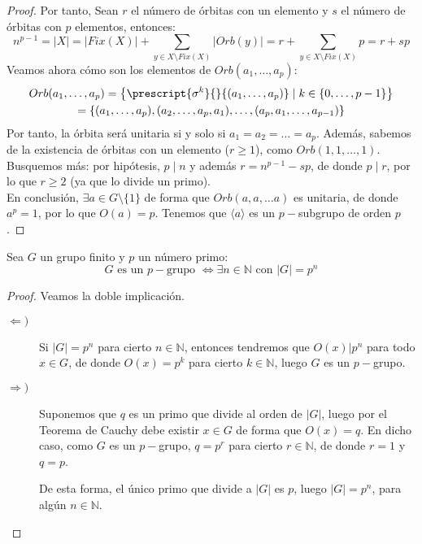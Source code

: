 \begin{teo}[de Cauchy]
\begin{proof}
        \noindent
        Por tanto,
        Sean $r$ el número de órbitas con un elemento y $s$ el número de órbitas con $p$ elementos, entonces:
        \begin{equation*}
            n^{p-1} = |X| = |Fix(X)| + \sum_{y\in X\setminus Fix(X)} |Orb(y)| = r + \sum_{y\in X\setminus Fix(X)} p = r + sp
        \end{equation*}
        Veamos ahora cómo son los elementos de $Orb(a_1,\ldots,a_p)$:
        \begin{multline*}
            Orb(a_1,\ldots,a_p) = \left\{\prescript{\sigma^k}{}{(a_1,\ldots,a_p)} \mid k\in \{0,\ldots,p-1\}\right\} \\
            = \{(a_1,\ldots,a_p), (a_2, \ldots, a_p, a_1), \ldots, (a_p, a_1, \ldots, a_{p-1})\}
        \end{multline*}
        Por tanto, la órbita será unitaria si y solo si $a_1 = a_2 = \ldots = a_p$. Además, sabemos de la existencia de órbitas con un elemento ($r\geq 1$), como $Orb(1,1,\ldots,1)$. Busquemos más: por hipótesis, $p \mid n$ y además $r = n^{p-1}-sp $, de donde $p\mid r$, por lo que $r\geq 2$ (ya que lo divide un primo).\\

        \noindent
        En conclusión, $\exists a\in G\setminus \{1\}$ de forma que $Orb(a,a,\ldots a)$ es unitaria, de donde $a^p = 1$, por lo que $O(a) = p$. Tenemos que $\langle a \rangle $ es un $p-$subgrupo de orden $p$.
    \end{proof}
\end{teo}

\begin{coro}
    Sea $G$ un grupo finito y $p$ un número primo:
    \begin{equation*}
        G \text{\ es un $p-$grupo\ } \Longleftrightarrow \exists n\in \mathbb{N} \text{\ con\ } |G| = p^n
    \end{equation*}
    \begin{proof}
        Veamos la doble implicación.
        \begin{description}
            \item [$\Longleftarrow)$] Si $|G| = p^n$ para cierto $n\in \mathbb{N}$, entonces tendremos que $O(x) | p^n$ para todo $x\in G$, de donde $O(x) = p^k$ para cierto $k\in \mathbb{N}$, luego $G$ es un $p-$grupo.
            \item [$\Longrightarrow)$] Suponemos que $q$ es un primo que divide al orden de $|G|$, luego por el Teorema de Cauchy debe existir $x\in G$ de forma que $O(x) = q$. En dicho caso, como $G$ es un $p-$grupo, $q = p^r$ para cierto $r\in \mathbb{N}$, de donde $r = 1$ y $q = p$.

                De esta forma, el único primo que divide a $|G|$ es $p$, luego $|G| = p^n$, para algún $n\in \mathbb{N}$. \qedhere
        \end{description}
    \end{proof}
\end{coro}

